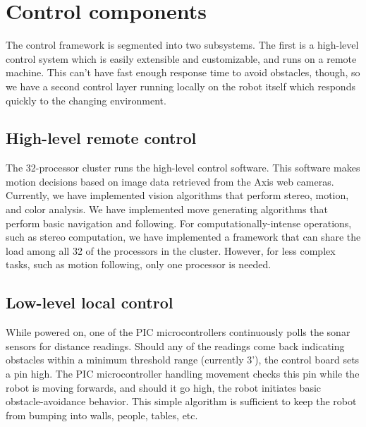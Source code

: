 \documentclass[12pt]{article}
\begin{document}
\section{Control components}
The control framework is segmented into two subsystems.  The first is a high-level control system which is easily extensible and customizable, and runs on a remote machine.  This can't have fast enough response time to avoid obstacles, though, so we have a second control layer running locally on the robot itself which responds quickly to the changing environment.
\subsection{High-level remote control}
The 32-processor cluster runs the high-level control software.  This software makes motion decisions based on image data retrieved from the Axis web cameras.  Currently, we have implemented vision algorithms that perform stereo, motion, and color analysis.  We have implemented move generating algorithms that perform basic navigation and following.  For computationally-intense operations, such as stereo computation, we have implemented a framework that can share the load among all 32 of the processors in the cluster.  However, for less complex tasks, such as motion following, only one processor is needed.
\subsection{Low-level local control}
While powered on, one of the PIC microcontrollers continuously polls the sonar sensors for distance readings.  Should any of the readings come back indicating obstacles within a minimum threshold range (currently 3'), the control board sets a pin high.  The PIC microcontroller handling movement checks this pin while the robot is moving forwards, and should it go high, the robot initiates basic obstacle-avoidance behavior.  This simple algorithm is sufficient to keep the robot from bumping into walls, people, tables, etc.
\end{document}

